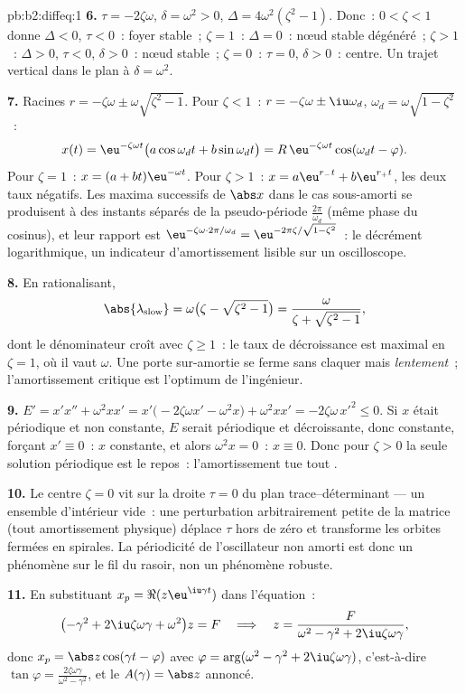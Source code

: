 \begin{solution}{pb:b2:diffeq:1}
\textbf{6.} $\tau = -2\zeta\omega$, $\delta = \omega^2 > 0$,
$\Delta = 4\omega^2(\zeta^2 - 1)$. Donc~: $0 < \zeta < 1$ donne
$\Delta < 0$, $\tau < 0$~: foyer stable~; $\zeta = 1$~: $\Delta =
0$~: nœud stable dégénéré~; $\zeta > 1$~: $\Delta > 0$, $\tau <
0$, $\delta > 0$~: nœud stable~; $\zeta = 0$~: $\tau = 0$,
$\delta > 0$~: centre. Un trajet vertical dans le plan à $\delta =
\omega^2$.

\textbf{7.} Racines $r = -\zeta\omega \pm
\omega\sqrt{\zeta^2-1}$. Pour $\zeta < 1$~: $r = -\zeta\omega
\pm \iu\omega_d$, $\omega_d = \omega\sqrt{1-\zeta^2}$~:
\[
x(t) = \eu^{-\zeta\omega t}\bigl(a\cos\omega_dt +
b\sin\omega_dt\bigr)
= R\,\eu^{-\zeta\omega t}\cos(\omega_dt - \varphi) .
\]
Pour $\zeta = 1$~: $x = (a + bt)\eu^{-\omega t}$. Pour $\zeta >
1$~: $x = a\eu^{r_-t} + b\eu^{r_+t}$, les deux taux négatifs. Les
maxima successifs de $\abs x$ dans le cas sous-amorti se produisent
à des instants séparés de la pseudo-période $\frac{2\pi}{\omega_d}$
(même phase du cosinus), et leur rapport est
$\eu^{-\zeta\omega\cdot2\pi/\omega_d} =
\eu^{-2\pi\zeta/\sqrt{1-\zeta^2}}$~: le décrément logarithmique,
un indicateur d'amortissement lisible sur un oscilloscope.

\textbf{8.} En rationalisant,
\[
\abs{\lambda_{\mathrm{slow}}} = \omega\bigl(\zeta -
\sqrt{\zeta^2-1}\bigr)
= \frac{\omega}{\zeta + \sqrt{\zeta^2 - 1}} ,
\]
dont le dénominateur croît avec $\zeta \geq 1$~: le taux de
décroissance est maximal en $\zeta = 1$, où il vaut $\omega$. Une
porte sur-amortie se ferme sans claquer mais \emph{lentement}~;
l'amortissement critique est l'optimum de l'ingénieur.

\textbf{9.} $E' = x'x'' + \omega^2xx' =
x'\bigl(-2\zeta\omega x' - \omega^2x\bigr) + \omega^2xx' =
-2\zeta\omega\,x'^2 \leq 0$. Si $x$ était périodique et
non constante, $E$ serait périodique et décroissante, donc
constante, forçant $x' \equiv 0$~: $x$ constante, et alors
$\omega^2x = 0$~: $x \equiv 0$. Donc pour $\zeta > 0$ la seule
solution périodique est le repos~: l'amortissement tue tout .

\textbf{10.} Le centre $\zeta = 0$ vit sur la droite $\tau =
0$ du plan trace--déterminant --- un ensemble d'intérieur vide~:
une perturbation arbitrairement petite de la matrice (tout
amortissement physique) déplace $\tau$ hors de zéro et transforme
les orbites fermées en spirales. La périodicité de l'oscillateur
non amorti est donc un phénomène sur le fil du rasoir, non un
phénomène robuste.

\textbf{11.} En substituant $x_p = \Re(z\eu^{\iu\gamma t})$ dans
l'équation~:
\[
\bigl(-\gamma^2 + 2\iu\zeta\omega\gamma +
\omega^2\bigr)z = F
\quad\Longrightarrow\quad
z = \frac{F}{\omega^2 - \gamma^2 + 2\iu\zeta\omega\gamma},
\]
donc $x_p = \abs z\cos(\gamma t - \varphi)$ avec $\varphi =
\arg(\omega^2 - \gamma^2 + 2\iu\zeta\omega\gamma)$, c'est-à-dire
$\tan\varphi = \frac{2\zeta\omega\gamma}{\omega^2 -
\gamma^2}$, et le $A(\gamma) = \abs z$ annoncé.


\end{solution}
